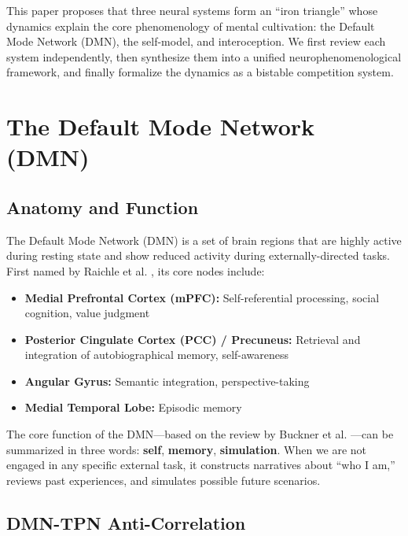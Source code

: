 \documentclass[11pt,a4paper]{article}
\begin{document}
This paper proposes that three neural systems form an ``iron triangle'' whose dynamics explain the core phenomenology of mental cultivation: the Default Mode Network (DMN), the self-model, and interoception. We first review each system independently, then synthesize them into a unified neurophenomenological framework, and finally formalize the dynamics as a bistable competition system.

\section{The Default Mode Network (DMN)}

\subsection{Anatomy and Function}

The Default Mode Network (DMN) is a set of brain regions that are highly active during resting state and show reduced activity during externally-directed tasks. First named by Raichle et al. \cite{Raichle2001}, its core nodes include:

\begin{itemize}[nosep]
    \item \textbf{Medial Prefrontal Cortex (mPFC):} Self-referential processing, social cognition, value judgment
    \item \textbf{Posterior Cingulate Cortex (PCC) / Precuneus:} Retrieval and integration of autobiographical memory, self-awareness
    \item \textbf{Angular Gyrus:} Semantic integration, perspective-taking
    \item \textbf{Medial Temporal Lobe:} Episodic memory
\end{itemize}

The core function of the DMN---based on the review by Buckner et al. \cite{Buckner2008}---can be summarized in three words: \textbf{self}, \textbf{memory}, \textbf{simulation}. When we are not engaged in any specific external task, it constructs narratives about ``who I am,'' reviews past experiences, and simulates possible future scenarios.

\subsection{DMN-TPN Anti-Correlation}
\end{document}
